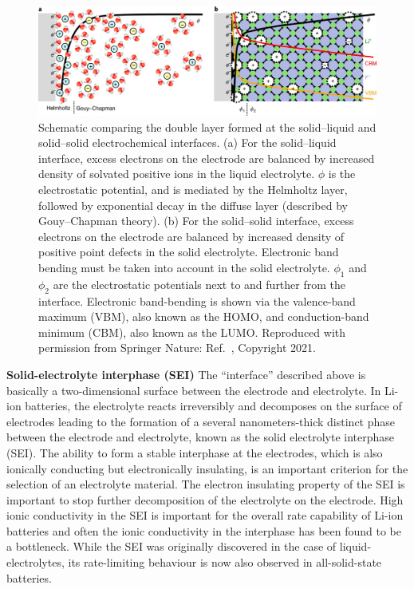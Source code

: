 \documentclass[../main.tex]{subfiles}
\begin{document}
\begin{figure}
    \centering
    \includegraphics[scale=0.35]{figures/edl.jpg}
    \caption{Schematic comparing the double layer formed at the solid–liquid and solid–solid electrochemical interfaces. (a) For the solid–liquid interface, excess electrons on the electrode are balanced by increased density of solvated positive ions in the liquid electrolyte. $\phi$ is the electrostatic potential, and is mediated by the Helmholtz layer, followed by exponential decay in the diffuse layer (described by Gouy–Chapman theory). (b) For the solid–solid interface, excess electrons on the electrode are balanced by increased density of positive point defects in the solid electrolyte. Electronic band bending must be taken into account in the solid electrolyte. $\phi_1$ and $\phi_2$ are the electrostatic potentials next to and further from the interface. Electronic band-bending is shown via the valence-band maximum (VBM), also known as the HOMO, and conduction-band minimum (CBM), also known as the LUMO. Reproduced with permission from Springer Nature: Ref.~, Copyright 2021.}
    \label{fig:edl}
\end{figure}

\textbf{Solid-electrolyte interphase (SEI)} The ``interface'' described above is basically a two-dimensional surface between the electrode and electrolyte. In Li-ion batteries, the electrolyte reacts irreversibly and decomposes on the surface of electrodes leading to the formation of a several nanometers-thick distinct phase between the electrode and electrolyte, known as the solid electrolyte interphase (SEI).\cite{Xu2011} The ability to form a stable interphase at the electrodes, which is also ionically conducting but electronically insulating, is an important criterion for the selection of an electrolyte material. The electron insulating property of the SEI is important to stop further decomposition of the electrolyte on the electrode.\cite{Xu2004,Goodenough2010} High ionic conductivity in the SEI is important for the overall rate capability of Li-ion batteries and often the ionic conductivity in the interphase has been found to be a bottleneck.\cite{Wang2018, Xu2014} While the SEI was originally discovered in the case of liquid-electrolytes, its rate-limiting behaviour is now also observed in all-solid-state batteries.\cite{Yu2017}
\end{document}
